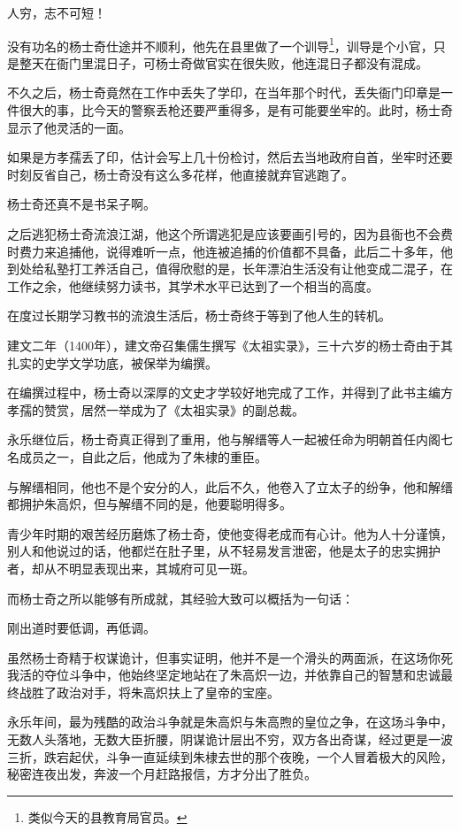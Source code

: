 \begin{multicols}{\theparacolNo}
人穷，志不可短！

没有功名的杨士奇仕途并不顺利，他先在县里做了一个训导\footnote{类似今天的县教育局官员。}，训导是个小官，只是整天在衙门里混日子，可杨士奇做官实在很失败，他连混日子都没有混成。

不久之后，杨士奇竟然在工作中丢失了学印，在当年那个时代，丢失衙门印章是一件很大的事，比今天的警察丢枪还要严重得多，是有可能要坐牢的。此时，杨士奇显示了他灵活的一面。

如果是方孝孺丢了印，估计会写上几十份检讨，然后去当地政府自首，坐牢时还要时刻反省自己，杨士奇没有这么多花样，他直接就弃官逃跑了。

杨士奇还真不是书呆子啊。

之后逃犯杨士奇流浪江湖，他这个所谓逃犯是应该要画引号的，因为县衙也不会费时费力来追捕他，说得难听一点，他连被追捕的价值都不具备，此后二十多年，他到处给私塾打工养活自己，值得欣慰的是，长年漂泊生活没有让他变成二混子，在工作之余，他继续努力读书，其学术水平已达到了一个相当的高度。

在度过长期学习教书的流浪生活后，杨士奇终于等到了他人生的转机。

建文二年（1400年），建文帝召集儒生撰写《太祖实录》，三十六岁的杨士奇由于其扎实的史学文学功底，被保举为编撰。

在编撰过程中，杨士奇以深厚的文史才学较好地完成了工作，并得到了此书主编方孝孺的赞赏，居然一举成为了《太祖实录》的副总裁。

永乐继位后，杨士奇真正得到了重用，他与解缙等人一起被任命为明朝首任内阁七名成员之一，自此之后，他成为了朱棣的重臣。

与解缙相同，他也不是个安分的人，此后不久，他卷入了立太子的纷争，他和解缙都拥护朱高炽，但与解缙不同的是，他要聪明得多。

青少年时期的艰苦经历磨炼了杨士奇，使他变得老成而有心计。他为人十分谨慎，别人和他说过的话，他都烂在肚子里，从不轻易发言泄密，他是太子的忠实拥护者，却从不明显表现出来，其城府可见一斑。

而杨士奇之所以能够有所成就，其经验大致可以概括为一句话：

刚出道时要低调，再低调。

虽然杨士奇精于权谋诡计，但事实证明，他并不是一个滑头的两面派，在这场你死我活的夺位斗争中，他始终坚定地站在了朱高炽一边，并依靠自己的智慧和忠诚最终战胜了政治对手，将朱高炽扶上了皇帝的宝座。

永乐年间，最为残酷的政治斗争就是朱高炽与朱高煦的皇位之争，在这场斗争中，无数人头落地，无数大臣折腰，阴谋诡计层出不穷，双方各出奇谋，经过更是一波三折，跌宕起伏，斗争一直延续到朱棣去世的那个夜晚，一个人冒着极大的风险，秘密连夜出发，奔波一个月赶路报信，方才分出了胜负。


\end{multicols}
